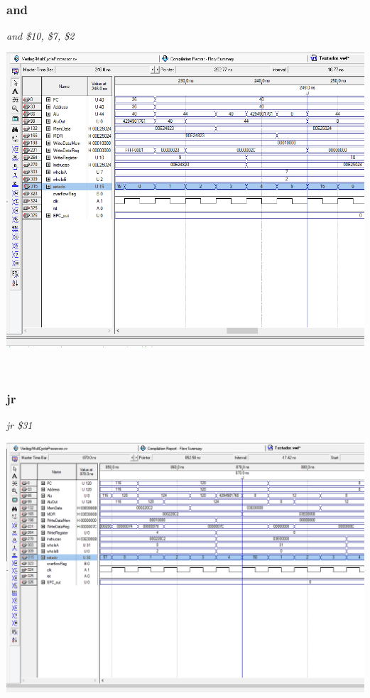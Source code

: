\documentclass{article}
\begin{document}
    \\
    \subsubsection{and}
    {\it and \$10, \$7, \$2}\\
    \begin{center}
        \includegraphics[scale=0.25]{and.PNG}
    \end{center}
    
    \\
    \subsubsection{jr}
    {\it jr \$31}\\
    \begin{center}
        \includegraphics[scale=0.25]{jr.PNG}
    \end{center}
    
\end{document}
